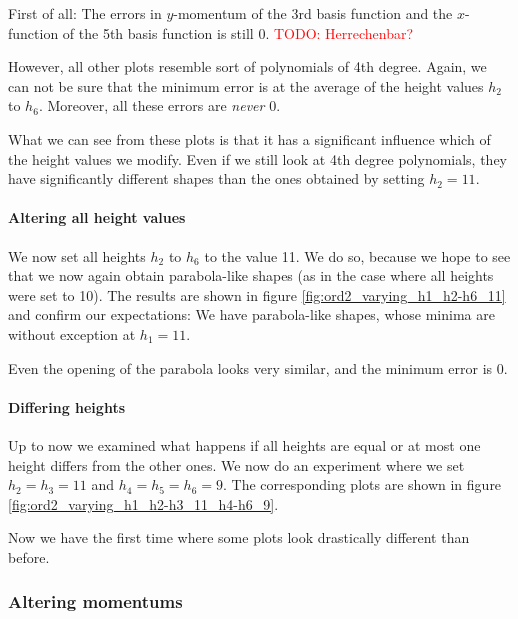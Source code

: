 \documentclass{article}
\newcommand{\todo}[1]{\textcolor{red}{TODO: #1}}
\begin{document}


First of all: The errors in $y$-momentum of the 3rd basis function and the $x$-function of the 5th basis function is still 0. \todo{Herrechenbar?} 

However, all other plots resemble sort of polynomials of 4th degree. Again, we can not be sure that the minimum error is at the average of the height values $h_2$ to $h_6$. Moreover, all these errors are \emph{never} 0.

What we can see from these plots is that it has a significant influence which of the height values we modify. Even if we still look at 4th degree polynomials, they have significantly different shapes than the ones obtained by setting $h_2=11$.

\paragraph{Altering all height values}

We now set all heights $h_2$ to $h_6$ to the value 11. We do so, because we hope to see that we now again obtain parabola-like shapes (as in the case where all heights were set to 10). The results are shown in figure \ref{fig:ord2_varying_h1_h2-h6_11} and confirm our expectations: We have parabola-like shapes, whose minima are without exception at $h_1=11$.



Even the opening of the parabola looks very similar, and the minimum error is 0.

\paragraph{Differing heights}

Up to now we examined what happens if all heights are equal or at most one height differs from the other ones. We now do an experiment where we set $h_2=h_3=11$ and $h_4=h_5=h_6=9$. The corresponding plots are shown in figure \ref{fig:ord2_varying_h1_h2-h3_11_h4-h6_9}.



Now we have the first time where some plots look drastically different than before.

\clearpage{}

\subsubsection{Altering momentums}
\label{sec:stiffness-analysis-ord2-altering-momentums}
\end{document}
